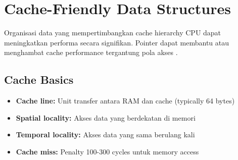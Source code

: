 \documentclass[../main.tex]{subfiles}
\begin{document}
\section{Cache-Friendly Data Structures}
Organisasi data yang mempertimbangkan cache hierarchy CPU dapat meningkatkan performa secara signifikan. Pointer dapat membantu atau menghambat cache performance tergantung pola akses \parencite{cpp-reference}.

\subsection{Cache Basics}
\begin{itemize}
  \item \textbf{Cache line:} Unit transfer antara RAM dan cache (typically 64 bytes)
  \item \textbf{Spatial locality:} Akses data yang berdekatan di memori
  \item \textbf{Temporal locality:} Akses data yang sama berulang kali
  \item \textbf{Cache miss:} Penalty 100-300 cycles untuk memory access
\end{itemize}
\end{document}
